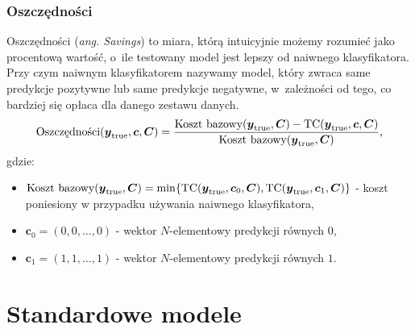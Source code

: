 \documentclass[inzynierska]{pwr_wmat_praca_dyplomowa}
\theoremstyle{plain}
\numberwithin{theorem}{chapter}
\theoremstyle{definition}
\numberwithin{theorem}{chapter}
\begin{document}
\subsubsection{Oszczędności}
Oszczędności (\textit{ang. Savings}) to miara, którą intuicyjnie możemy rozumieć jako procentową wartość, o~ile testowany model jest lepszy od naiwnego klasyfikatora. Przy czym naiwnym klasyfikatorem nazywamy model, który zwraca same predykcje pozytywne lub same predykcje negatywne, w~zależności od tego, co bardziej się opłaca dla danego zestawu danych.
\begin{equation}
	\label{oszczednosci}
	\text{Oszczędności}(\boldsymbol{y}_{\text{true}}, \boldsymbol{c}, \boldsymbol{C}) = \frac{\text{Koszt bazowy}(\boldsymbol{y}_{\text{true}}, \boldsymbol{C}) - \text{TC}(\boldsymbol{y}_{\text{true}}, \boldsymbol{c}, \boldsymbol{C})}{\text{Koszt bazowy}(\boldsymbol{y}_{\text{true}}, \boldsymbol{C})} \text{,}
\end{equation}
gdzie:
\begin{itemize}
	\item $ \text{Koszt bazowy}(\boldsymbol{y}_{\text{true}}, \boldsymbol{C}) = \min\{\text{TC}(\boldsymbol{y}_{\text{true}}, \boldsymbol{c}_0, \boldsymbol{C}), \text{TC}(\boldsymbol{y}_{\text{true}}, \boldsymbol{c}_1, \boldsymbol{C})\}$ - koszt poniesiony w przypadku używania naiwnego klasyfikatora,
	\item $\boldsymbol{c}_0 = (0, 0, \dots, 0)$ - wektor $N$-elementowy predykcji równych $0$,
	\item $\boldsymbol{c}_1 = (1, 1, \dots, 1)$ - wektor $N$-elementowy predykcji równych $1$.
\end{itemize}{}

\section{Standardowe modele}
\end{document}
